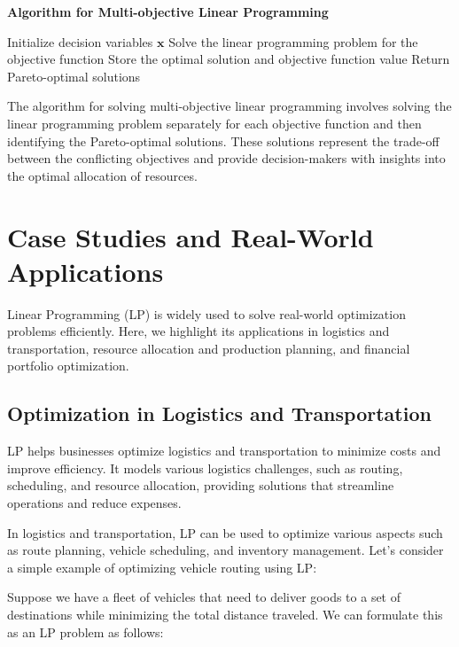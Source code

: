 \documentclass[12pt]{book} %
\begin{document}
\textbf{Algorithm for Multi-objective Linear Programming}
\FloatBarrier
\begin{algorithm}
\caption{Multi-objective Linear Programming}
\begin{algorithmic}[1]
\State Initialize decision variables $\mathbf{x}$
    \State Solve the linear programming problem for the objective function
    \State Store the optimal solution and objective function value
\EndFor
\State Return Pareto-optimal solutions
\end{algorithmic}
\end{algorithm}
\FloatBarrier
The algorithm for solving multi-objective linear programming involves solving the linear programming problem separately for each objective function and then identifying the Pareto-optimal solutions. These solutions represent the trade-off between the conflicting objectives and provide decision-makers with insights into the optimal allocation of resources.


\section{Case Studies and Real-World Applications}

Linear Programming (LP) is widely used to solve real-world optimization problems efficiently. Here, we highlight its applications in logistics and transportation, resource allocation and production planning, and financial portfolio optimization.

\subsection{Optimization in Logistics and Transportation}

LP helps businesses optimize logistics and transportation to minimize costs and improve efficiency. It models various logistics challenges, such as routing, scheduling, and resource allocation, providing solutions that streamline operations and reduce expenses.

In logistics and transportation, LP can be used to optimize various aspects such as route planning, vehicle scheduling, and inventory management. Let's consider a simple example of optimizing vehicle routing using LP:

Suppose we have a fleet of vehicles that need to deliver goods to a set of destinations while minimizing the total distance traveled. We can formulate this as an LP problem as follows:
\end{document}
